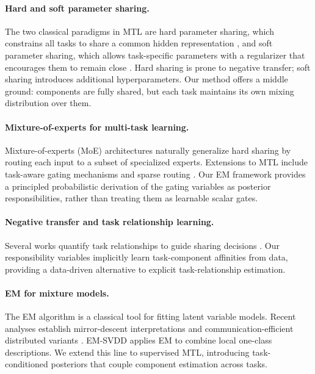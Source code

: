 \documentclass[preprint,12pt]{elsarticle}
\begin{document}
	\paragraph{Hard and soft parameter sharing.}
	The two classical paradigms in MTL are hard parameter sharing, which
	constrains all tasks to share a common hidden representation
	\citep{caruana1997multitask}, and soft parameter sharing, which allows
	task-specific parameters with a regularizer that encourages them to
	remain close \citep{duong2015low}. Hard sharing is prone to negative
	transfer; soft sharing introduces additional hyperparameters. Our
	method offers a middle ground: components are fully shared, but each
	task maintains its own mixing distribution over them.
	
	\paragraph{Mixture-of-experts for multi-task learning.}
	Mixture-of-experts (MoE) architectures \citep{jacobs1991adaptive,
		jordan1994hierarchical} naturally generalize hard sharing by
	routing each input to a subset of specialized experts. Extensions to
	MTL include task-aware gating mechanisms \citep{ma2019snr,
		liu2019end} and sparse routing \citep{chen2023mod}. Our EM framework
	provides a principled probabilistic derivation of the gating variables
	as posterior responsibilities, rather than treating them as learnable
	scalar gates.
	
	\paragraph{Negative transfer and task relationship learning.}
	Several works quantify task relationships to guide sharing decisions
	\citep{zamir2018taskonomy, fifty2021efficiently}. Our responsibility
	variables implicitly learn task-component affinities from data,
	providing a data-driven alternative to explicit task-relationship
	estimation.
	
	\paragraph{EM for mixture models.}
	The EM algorithm \citep{dempster1977maximum} is a classical tool for
	fitting latent variable models. Recent analyses establish mirror-descent
	interpretations \citep{fruytier2024learning} and communication-efficient
	distributed variants \citep{zhang2022distributed}. EM-SVDD
	\citep{eghdami2021sparsity} applies EM to combine local one-class
	descriptions. We extend this line to supervised MTL, introducing
	task-conditioned posteriors that couple component estimation across
	tasks.
	
\end{document}
